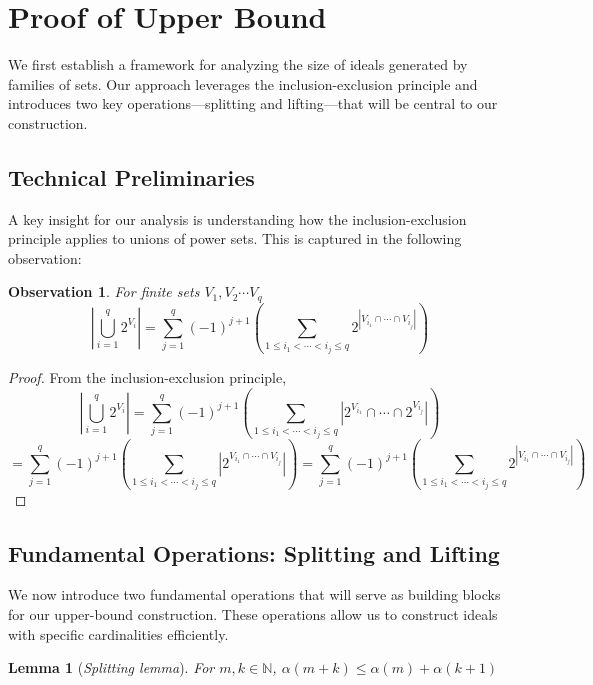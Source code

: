 \documentclass[11pt,a4paper]{article}
\newtheorem{lemma}[theorem]{Lemma}
\newtheorem{observation}[theorem]{Observation}
\theoremstyle{definition}
\begin{document}
%

%

%
%
\section{Proof of Upper Bound}\label{sec:upper}

We first establish a framework for analyzing the size of ideals generated by 
families of sets. Our approach leverages the inclusion-exclusion principle 
and introduces two key operations—splitting and lifting—that will be central 
to our construction.

\subsection{Technical Preliminaries}

A key insight for our analysis is understanding how the inclusion-exclusion 
principle applies to unions of power sets. This is captured in the following 
observation:

\begin{observation}\label{inclexclpowset}
	For finite sets $V_1,V_2\cdots V_q$
	$$
	|\bigcup_{i=1}^{q} 2^{V_i} | = \sum_{j=1}^{q}(-1)^{j+1} ( \sum_{1 \leq 
		i_1 < \cdots < i_j \leq q} 2^{|V_{i_1} \cap \cdots \cap V_{i_j}|} )
	$$      
\end{observation}

\begin{proof}
	From the inclusion-exclusion principle,
	$$
	|\bigcup_{i=1}^{q} 2^{V_i} | = \sum_{j=1}^{q}(-1)^{j+1} ( \sum_{1 \leq 
		i_1 < \cdots < i_j \leq q} |2^{V_{i_1}} \cap \cdots \cap 2^{V_{i_j}}| )
	$$
	$$
	= \sum_{j=1}^{q}(-1)^{j+1} ( \sum_{1 \leq i_1 < \cdots < i_j \leq q} 
	|2^{V_{i_1} \cap \cdots \cap V_{i_j}}| )
	= \sum_{j=1}^{q}(-1)^{j+1} ( \sum_{1 \leq i_1 < \cdots < i_j \leq q} 
	2^{|V_{i_1} \cap \cdots \cap V_{i_j}|} )
	$$     
\end{proof}

\subsection{Fundamental Operations: Splitting and Lifting}

We now introduce two fundamental operations that will serve as building 
blocks for our upper-bound construction. These operations allow us to 
construct ideals with specific cardinalities efficiently. 

\begin{lemma}[\textit{Splitting lemma}]\label{split} 
	For $m,k \in \mathbb{N}$, $\alpha(m+k)\leq \alpha(m)+\alpha(k+1)$
\end{lemma}
\end{document}
